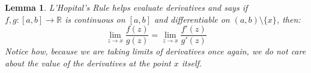 \documentclass[10pt,letterpaper]{article} %
\newtheorem{lem}{Lemma}[section]
\begin{document}
\medskip
\begin{lem}
L'Hopital's Rule helps evaluate derivatives and says if $f, g: [a, b] \xrightarrow{} \mathbb{R}$ is continuous on $[a, b]$ and differentiable on $(a, b)\setminus \{x\}$, then:
\begin{equation*}
\lim_{z \xrightarrow{} x}\frac{f(z)}{g(z)} = \lim_{z \xrightarrow{} x}\frac{f'(z)}{g'(z)}
\end{equation*}
Notice how, because we are taking limits of derivatives once again, we do not care about the value of the derivatives at the point $x$ itself. 
\end{lem}

\medskip
\end{document}
